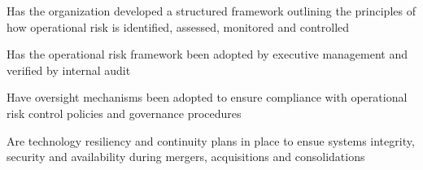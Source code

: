 %
%



\begin{maturity-dimensions}

  \item Has the organization developed a structured framework outlining the principles of how
        operational risk is identified, assessed, monitored and controlled
  \item Has the operational risk framework been adopted by executive management and verified by
        internal audit
  \item Have oversight mechanisms been adopted to ensure compliance with operational risk
        control policies and governance procedures
  \item Are technology resiliency and continuity plans in place to ensue systems integrity,
        security and availability during mergers, acquisitions and consolidations

\end{maturity-dimensions}


